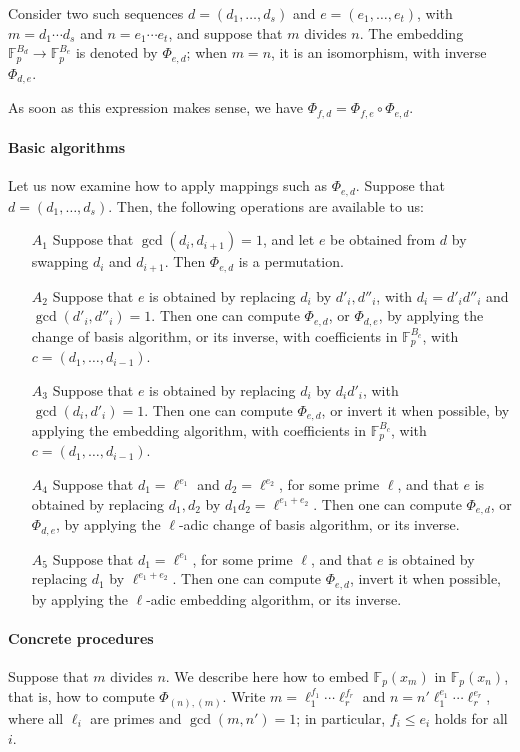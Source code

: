 \documentclass{sig-alternate}
\def\F {\ensuremath{\mathbb{F}}}
\newcounter{algo}
\begin{document}
Consider two such sequences $d=(d_1,\dots,d_s)$ and
$e=(e_1,\dots,e_t)$, with $m=d_1 \cdots d_s$ and $n=e_1 \cdots e_t$,
and suppose that $m$ divides $n$. The embedding $\F_p^{B_d} \to
\F_p^{B_e}$ is denoted by $\Phi_{e,d}$; when $m=n$, it is an
isomorphism, with inverse $\Phi_{d,e}$.

As soon as this expression makes sense, we have $\Phi_{f,d} =
\Phi_{f,e}\circ \Phi_{e,d}$.

\paragraph*{\bf \rm {Basic algorithms}}
Let us now examine how to apply mappings such as $\Phi_{e,d}$.
Suppose that $d=(d_1,\dots,d_s)$. Then, the following operations are
available to us:
\begin{itemize}
\item[$A_1$] Suppose that $\gcd(d_i,d_{i+1})=1$, and let $e$ be
  obtained from $d$ by swapping $d_i$ and $d_{i+1}$. Then $\Phi_{e,d}$
  is a permutation.
\item[$A_2$] Suppose that $e$ is obtained by replacing $d_i$ by $d'_i,
  d''_i$, with $d_i = d'_i d''_i$ and $\gcd(d'_i,d''_i)=1$. Then one
  can compute $\Phi_{e,d}$, or $\Phi_{d,e}$, by applying the change of
  basis algorithm, or its inverse, with coefficients in
  $\F_p^{B_c}$, with $c=(d_1,\dots,d_{i-1})$.
\item[$A_3$] Suppose that $e$ is obtained by replacing $d_i$ by $d_i
  d'_i$, with $\gcd(d_i, d'_i)=1$. Then one can compute $\Phi_{e,d}$,
  or invert it when possible, by applying the embedding algorithm,
  with coefficients in $\F_p^{B_c}$, with $c=(d_1,\dots,d_{i-1})$.
\item[$A_4$] Suppose that $d_1=\ell^{e_1}$ and $d_2=\ell^{e_2}$, for some
  prime $\ell$, and that $e$ is obtained by replacing $d_1,d_2$ by
  $d_1 d_2=\ell^{e_1+e_2}$. Then one can compute $\Phi_{e,d}$, or
  $\Phi_{d,e}$, by applying the $\ell$-adic change of basis algorithm,
  or its inverse. 
\item[$A_5$] Suppose that $d_1=\ell^{e_1}$, for some prime $\ell$, and that
  $e$ is obtained by replacing $d_1$ by $\ell^{e_1+e_2}$. Then one can
  compute $\Phi_{e,d}$, invert it when possible, by applying the
  $\ell$-adic embedding algorithm, or its inverse. 
\end{itemize}

\paragraph*{{\bf \rm Concrete procedures}} Suppose that $m$ divides $n$. We 
describe here how to embed $\F_p(x_m)$ in $\F_p(x_n)$, that is, how to
compute $\Phi_{(n),(m)}$. Write $m= \ell_1^{f_1}\cdots \ell_r^{f_r}$
and $n = n' \ell_1^{e_1}\cdots \ell_r^{e_r}$, where all $\ell_i$ are
primes and $\gcd(m,n')=1$; in particular, $f_i \le e_i$ holds for all
$i$.
\end{document}
